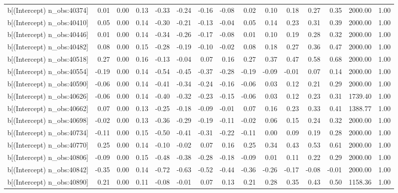 \begin{table}[ht]
\begin{tabular}{rrrrrrrrrrrrrrr}
  b[(Intercept) n\_obs:40374] & 0.01 & 0.00 & 0.13 & -0.33 & -0.24 & -0.16 & -0.08 & 0.02 & 0.10 & 0.18 & 0.27 & 0.35 & 2000.00 & 1.00 \\ 
  b[(Intercept) n\_obs:40410] & 0.05 & 0.00 & 0.14 & -0.30 & -0.21 & -0.13 & -0.04 & 0.05 & 0.14 & 0.23 & 0.31 & 0.39 & 2000.00 & 1.00 \\ 
  b[(Intercept) n\_obs:40446] & 0.01 & 0.00 & 0.14 & -0.34 & -0.26 & -0.17 & -0.08 & 0.01 & 0.10 & 0.19 & 0.28 & 0.32 & 2000.00 & 1.00 \\ 
  b[(Intercept) n\_obs:40482] & 0.08 & 0.00 & 0.15 & -0.28 & -0.19 & -0.10 & -0.02 & 0.08 & 0.18 & 0.27 & 0.36 & 0.47 & 2000.00 & 1.00 \\ 
  b[(Intercept) n\_obs:40518] & 0.27 & 0.00 & 0.16 & -0.13 & -0.04 & 0.07 & 0.16 & 0.27 & 0.37 & 0.47 & 0.58 & 0.68 & 2000.00 & 1.00 \\ 
  b[(Intercept) n\_obs:40554] & -0.19 & 0.00 & 0.14 & -0.54 & -0.45 & -0.37 & -0.28 & -0.19 & -0.09 & -0.01 & 0.07 & 0.14 & 2000.00 & 1.00 \\ 
  b[(Intercept) n\_obs:40590] & -0.06 & 0.00 & 0.14 & -0.41 & -0.34 & -0.24 & -0.16 & -0.06 & 0.03 & 0.12 & 0.21 & 0.29 & 2000.00 & 1.00 \\ 
  b[(Intercept) n\_obs:40626] & -0.06 & 0.00 & 0.14 & -0.40 & -0.32 & -0.23 & -0.15 & -0.06 & 0.03 & 0.12 & 0.23 & 0.31 & 1739.40 & 1.00 \\ 
  b[(Intercept) n\_obs:40662] & 0.07 & 0.00 & 0.13 & -0.25 & -0.18 & -0.09 & -0.01 & 0.07 & 0.16 & 0.23 & 0.33 & 0.41 & 1388.77 & 1.00 \\ 
  b[(Intercept) n\_obs:40698] & -0.02 & 0.00 & 0.13 & -0.36 & -0.29 & -0.19 & -0.11 & -0.02 & 0.06 & 0.15 & 0.24 & 0.32 & 2000.00 & 1.00 \\ 
  b[(Intercept) n\_obs:40734] & -0.11 & 0.00 & 0.15 & -0.50 & -0.41 & -0.31 & -0.22 & -0.11 & 0.00 & 0.09 & 0.19 & 0.28 & 2000.00 & 1.00 \\ 
  b[(Intercept) n\_obs:40770] & 0.25 & 0.00 & 0.14 & -0.10 & -0.02 & 0.07 & 0.16 & 0.25 & 0.34 & 0.43 & 0.53 & 0.61 & 2000.00 & 1.00 \\ 
  b[(Intercept) n\_obs:40806] & -0.09 & 0.00 & 0.15 & -0.48 & -0.38 & -0.28 & -0.18 & -0.09 & 0.01 & 0.11 & 0.22 & 0.29 & 2000.00 & 1.00 \\ 
  b[(Intercept) n\_obs:40842] & -0.35 & 0.00 & 0.14 & -0.72 & -0.63 & -0.52 & -0.44 & -0.36 & -0.26 & -0.17 & -0.08 & -0.01 & 2000.00 & 1.00 \\ 
  b[(Intercept) n\_obs:40890] & 0.21 & 0.00 & 0.11 & -0.08 & -0.01 & 0.07 & 0.13 & 0.21 & 0.28 & 0.35 & 0.43 & 0.50 & 1158.36 & 1.00 \\ 

\end{tabular}
\end{table}
